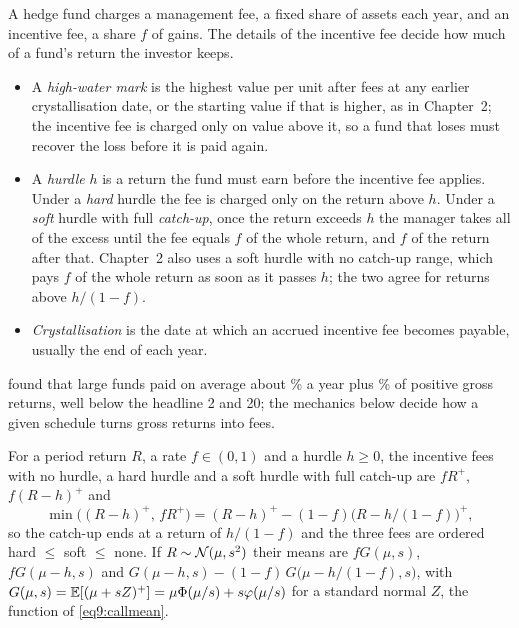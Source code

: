 \begin{chapterrefs}
A hedge fund charges a management fee, a fixed share of assets each year, and an incentive fee, a share
$f$ of gains. The details of the incentive fee decide how much of a fund's return the investor keeps.
\begin{itemize}
  \item A \emph{high-water mark} is the highest value per unit after fees at any earlier
        crystallisation date, or the starting value if that is higher, as in Chapter~2; the incentive fee
        is charged only on value above it, so a fund that loses must recover the loss before it is paid
        again.
  \item A \emph{hurdle} $h$ is a return the fund must earn before the incentive fee applies. Under a
        \emph{hard} hurdle the fee is charged only on the return above $h$. Under a \emph{soft} hurdle with
        full \emph{catch-up}, once the return exceeds $h$ the manager takes all of the excess until the
        fee equals $f$ of the whole return, and $f$ of the return after that. Chapter~2 also uses a
        soft hurdle with no catch-up range, which pays $f$ of the whole return as soon as it passes
        $h$; the two agree for returns above $h/(1-f)$.
  \item \emph{Crystallisation} is the date at which an accrued incentive fee becomes payable, usually
        the end of each year.
\end{itemize}

 found that large funds paid on average about \hdFeeMgmt\% a year plus \hdFeeInc\% of
positive gross returns, well below the headline 2 and 20; the mechanics below decide how a given
schedule turns gross returns into fees.

\begin{proposition}[Hurdles]\label{prop9:hurdle}
For a period return $R$, a rate $f\in(0,1)$ and a hurdle $h\ge0$, the incentive fees with no hurdle, a
hard hurdle and a soft hurdle with full catch-up are $fR^+$, $f(R-h)^+$ and
\begin{equation}\label{eq9:soft}
  \min\bigl((R-h)^+,\,fR^+\bigr)=(R-h)^+-(1-f)\bigl(R-h/(1-f)\bigr)^+,
\end{equation}
so the catch-up ends at a return of $h/(1-f)$ and the three fees are ordered hard $\le$ soft $\le$ none. If
$R\sim\mathcal{N}(\mu,s^2)$ their means are $fG(\mu,s)$, $fG(\mu-h,s)$ and $G(\mu-h,s)-(1-f)\,G\bigl(\mu-h/(1-f),s\bigr)$, with
$G(\mu,s)=\mathbb{E}[(\mu+sZ)^+]=\mu\Phi(\mu/s)+s\varphi(\mu/s)$ for a standard normal $Z$, the function of
\cref{eq9:callmean}.
\end{proposition}


\end{chapterrefs}
